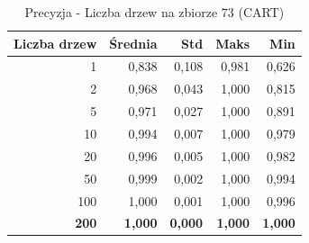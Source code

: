 \begin{table}[htbp]
\centering
\small
\setlength{\tabcolsep}{6pt}
\renewcommand{\arraystretch}{1.2}
\caption{Precyzja - Liczba drzew na zbiorze 73 (CART)}
\label{tab:CART_tree_count_73_precision}
\begin{tabular}{r|r|r|r|r}
\toprule
Liczba drzew & Średnia & Std & Maks & Min \\
\hline
1 & 0,838 & 0,108 & 0,981 & 0,626 \\
2 & 0,968 & 0,043 & 1,000 & 0,815 \\
5 & 0,971 & 0,027 & 1,000 & 0,891 \\
10 & 0,994 & 0,007 & 1,000 & 0,979 \\
20 & 0,996 & 0,005 & 1,000 & 0,982 \\
50 & 0,999 & 0,002 & 1,000 & 0,994 \\
100 & 1,000 & 0,001 & 1,000 & 0,996 \\
\textbf{200} & \textbf{1,000} & \textbf{0,000} & \textbf{1,000} & \textbf{1,000} \\
\bottomrule
\end{tabular}
\end{table}